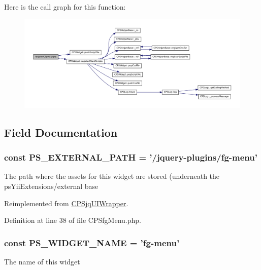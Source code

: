 Here is the call graph for this function:\nopagebreak
\begin{figure}[H]
\begin{center}
\leavevmode
\includegraphics[width=400pt]{classCPSfgMenu_ac02a66bde8e72e4909137bf748edf665_cgraph}
\end{center}
\end{figure}




\subsection{Field Documentation}
\hypertarget{classCPSfgMenu_a8ccb5e1d65c091f944a6aa8c5be834ca}{
\subsubsection[{PS\_\-EXTERNAL\_\-PATH}]{\setlength{\rightskip}{0pt plus 5cm}const {\bf PS\_\-EXTERNAL\_\-PATH} = '/jquery-\/plugins/fg-\/menu'}}
\label{classCPSfgMenu_a8ccb5e1d65c091f944a6aa8c5be834ca}
The path where the assets for this widget are stored (underneath the psYiiExtensions/external base 

Reimplemented from \hyperlink{classCPSjqUIWrapper_a8ccb5e1d65c091f944a6aa8c5be834ca}{CPSjqUIWrapper}.



Definition at line 38 of file CPSfgMenu.php.

\hypertarget{classCPSfgMenu_ae357f9dc377f7de0d12010b2ced28cbc}{
\subsubsection[{PS\_\-WIDGET\_\-NAME}]{\setlength{\rightskip}{0pt plus 5cm}const {\bf PS\_\-WIDGET\_\-NAME} = 'fg-\/menu'}}
\label{classCPSfgMenu_ae357f9dc377f7de0d12010b2ced28cbc}
The name of this widget 

